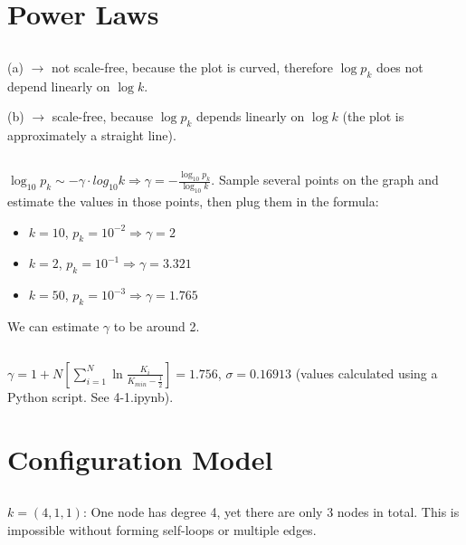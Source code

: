 \documentclass {article}
\begin{document}
\section{Power Laws}

\subsection{}
(a) $ \to $ not scale-free, because the plot is curved, therefore $ \log p_k $ does not depend linearly on $ \log k $.

(b) $ \to $ scale-free, because $ \log p_k $ depends linearly on $ \log k $ (the plot is approximately a straight line).

\subsection{}
$ \log_{10} p_k \sim - \gamma \cdot log_{10} k \Rightarrow
  \gamma = - \frac{ \log_{10} p_k }{ \log_{10} k } $. 
Sample several points on the graph and estimate the values in those points, then plug them in the formula:

\begin{itemize}
  \item $ k = 10 $, $ p_k = 10^{-2} \Rightarrow \gamma = 2 $
  \item $ k = 2  $, $ p_k = 10^{-1} \Rightarrow \gamma = 3.321 $
  \item $ k = 50 $, $ p_k = 10^{-3} \Rightarrow \gamma = 1.765 $
\end{itemize}

We can estimate $ \gamma $ to be around 2.

\subsection{}
$ \gamma = 1 + N[\sum^N_{i=1} \ln \frac{ K_i }{ K_{min}-\frac{1}{2} }] = 1.756 $, $ \sigma = 0.16913 $ (values calculated using a Python script. See 4-1.ipynb).

\newpage



\section{Configuration Model}

\subsection{}
$ k = (4, 1, 1) $: One node has degree 4, yet there are only 3 nodes in total. This is impossible without forming self-loops or multiple edges.
\end{document}
